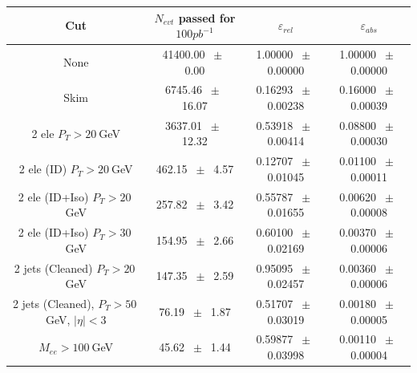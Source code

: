 \begin{table}[htbp] 
\begin{center} 
\begin{tabular}{|c|c|c|c|} 
\hline\hline 
 Cut & $N_{evt}$ passed for $100pb^{-1}$ & $\varepsilon_{rel}$ & $\varepsilon_{abs}$ \\ 
\hline\hline 
None          &           41400.00          $~\pm~$          0.00           &           1.00000          $~\pm~$          0.00000           &           1.00000          $~\pm~$          0.00000          \\          
          Skim          &           6745.46          $~\pm~$          16.07           &           0.16293          $~\pm~$          0.00238           &           0.16000          $~\pm~$          0.00039          \\          
          2 ele $P_T>20~$GeV          &           3637.01          $~\pm~$          12.32           &           0.53918          $~\pm~$          0.00414           &           0.08800          $~\pm~$          0.00030          \\          
          2 ele (ID) $P_T>20~$GeV          &           462.15          $~\pm~$          4.57           &           0.12707          $~\pm~$          0.01045           &           0.01100          $~\pm~$          0.00011          \\          
          2 ele (ID+Iso) $P_T>20~$GeV          &           257.82          $~\pm~$          3.42           &           0.55787          $~\pm~$          0.01655           &           0.00620          $~\pm~$          0.00008          \\          
          2 ele (ID+Iso) $P_T>30~$GeV          &           154.95          $~\pm~$          2.66           &           0.60100          $~\pm~$          0.02169           &           0.00370          $~\pm~$          0.00006          \\          
          2 jets (Cleaned) $P_T>20~$GeV          &           147.35          $~\pm~$          2.59           &           0.95095          $~\pm~$          0.02457           &           0.00360          $~\pm~$          0.00006          \\          
          2 jets (Cleaned), $P_T>50~$GeV, $ | \eta |<3$          &           76.19          $~\pm~$          1.87           &           0.51707          $~\pm~$          0.03019           &           0.00180          $~\pm~$          0.00005          \\          
          $M_{ee}>100~$GeV          &           45.62          $~\pm~$          1.44           &           0.59877          $~\pm~$          0.03998           &           0.00110          $~\pm~$          0.00004          \\          

\end{tabular}
\end{center}
\end{table}
